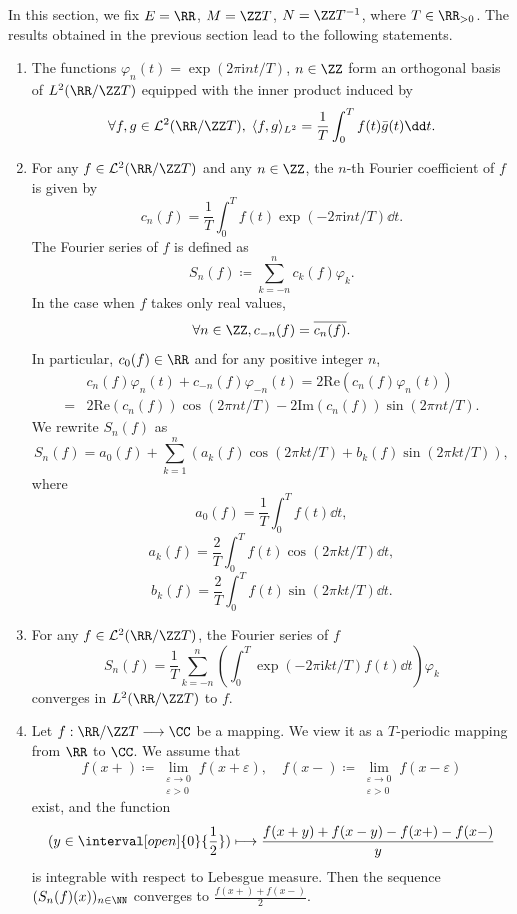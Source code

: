 In this section, we fix $E = \RR$, $M = \ZZ T$, $N = \ZZ T^{-1}$, where $T \in \RR_{> 0}$.
The results obtained in the previous section lead to the following statements.
\begin{enumerate}[label=(\arabic*)]
    \item The functions $\varphi_{n}(t) = \exp(2\pi\mathrm{i}nt/T)$, $n \in \ZZ$ form an orthogonal basis of $L^2(\RR/\ZZ T)$ equipped with the inner product induced by 
        $$\forall f,g \in \mathcal{L}^2(\RR/\ZZ T), \; \langle f,g \rangle_{L^2} = \frac{1}{T} \int_{0}^{T} f(t) \bar{g}(t) \dd t.$$
    \item For any $f \in \mathcal{L}^{2}(\RR/\ZZ T)$ and any $n \in \ZZ$, the $n$-th Fourier coefficient of $f$ is given by
        $$c_{n}(f) = \frac{1}{T} \int_{0}^{T} f(t) \exp(-2\pi\mathrm{i}n t/T) \dd t.$$
        The Fourier series of $f$ is defined as
        $$S_n(f) \coloneq \sum_{k=-n}^{n} c_{k}(f) \varphi_{k}.$$
        In the case when $f$ takes only real values,
        $$\forall n \in \ZZ, c_{-n}(f) = \overline{c_{n}(f)}.$$
        In particular, $c_{0}(f) \in \RR$ and for any positive integer $n$,
        $$\begin{aligned}
            & c_n(f) \varphi_n(t) + c_{-n}(f) \varphi_{-n}(t) = 2 \mathrm{Re}(c_{n}(f) \varphi_{n}(t))\\
            = & 2 \mathrm{Re}(c_{n}(f)) \cos(2 \pi n t/T) - 2 \mathrm{Im}(c_{n}(f)) \sin(2 \pi n t/T).
        \end{aligned}$$
        We rewrite $S_n(f)$ as
        $$S_n(f) = a_0(f) + \sum_{k=1}^{n} (a_{k}(f) \cos(2 \pi k t/T) + b_{k}(f) \sin(2 \pi k t/T)),$$
        where
        $$a_0(f) = \frac{1}{T} \int_{0}^{T} f(t) \dd t,$$
        $$a_{k}(f) = \frac{2}{T} \int_{0}^{T} f(t) \cos(2 \pi k t/T) \dd t,$$
        $$b_{k}(f) = \frac{2}{T} \int_{0}^{T} f(t) \sin(2 \pi k t/T) \dd t.$$
    \item For any $f \in \mathcal{L}^{2}(\RR/\ZZ T)$, the Fourier series of $f$
        $$S_n(f) = \frac{1}{T} \sum_{k=-n}^{n} \left(\int_{0}^{T}\exp(-2\pi\mathrm{i}kt/T) f(t) \dd t\right) \varphi_{k}$$
        converges in $L^2(\RR/\ZZ T)$ to $f$.
    \item Let $f : \RR/\ZZ T \longrightarrow \CC$ be a mapping.
        We view it as a $T$-periodic mapping from $\RR$ to $\CC$.
        We assume that
        $$f(x +) \coloneq \lim_{\substack{\varepsilon \to 0\\\varepsilon > 0}} f(x + \varepsilon),\quad f(x-) \coloneq \lim_{\substack{\varepsilon \to 0\\\varepsilon > 0}} f(x - \varepsilon)$$
        exist, and the function
        $$(y \in \interval[open]{0}{\frac{1}{2}}) \longmapsto \frac{f(x + y) + f(x - y) - f(x + ) - f(x - )}{y}$$
        is integrable with respect to Lebesgue measure.
        Then the sequence $(S_{n}(f)(x))_{n \in \NN}$ converges to $\frac{f(x+) + f(x-)}{2}$.
\end{enumerate}

